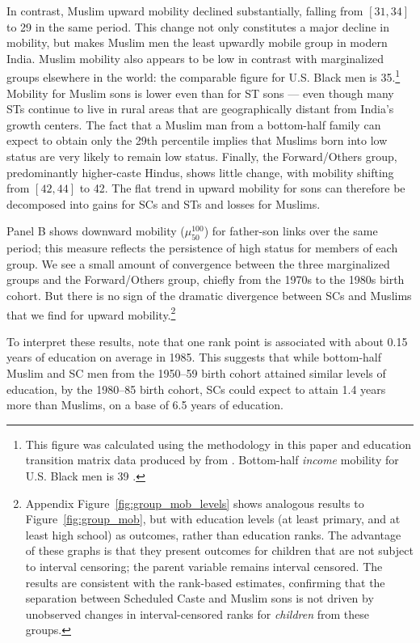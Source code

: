 \documentclass[12pt,letterpaper]{article}
\numberwithin{equation}{section}
\begin{document}
In contrast, Muslim upward mobility declined substantially, falling from $[31, 34]$ to 29 in the same period. This change not only constitutes a major decline in mobility, but makes Muslim men the least upwardly mobile group in modern India. Muslim mobility also appears to be low in contrast with marginalized groups elsewhere in the world: the comparable figure for U.S. Black men is 35.\footnote{This figure was calculated using the methodology in this paper and education transition matrix data produced by  from . Bottom-half \textit{income} mobility for U.S. Black men is 39 \cite{chetty2018}.} Mobility for Muslim sons is lower even than for ST sons --- even though many STs continue to live in rural areas that are geographically distant from India's growth centers. The fact that a Muslim man from a bottom-half family can expect to obtain only the 29th percentile implies that Muslims born into low status are very likely to remain low status. Finally, the Forward/Others group, predominantly higher-caste Hindus, shows little change, with mobility shifting from $[42,44]$ to 42. The flat trend in upward mobility for sons can therefore be decomposed into gains for SCs and STs and losses for Muslims.

Panel B shows downward mobility ($\mu_{50}^{100}$) for father-son links over the same period; this measure reflects the persistence of high status for members of each group. We see a small amount of convergence between the three marginalized groups and the Forward/Others group, chiefly from the 1970s to the 1980s birth cohort. But there is no sign of the dramatic divergence between SCs and Muslims that we find for upward mobility.\footnote{Appendix Figure~\ref{fig:group_mob_levels} shows analogous results to Figure~\ref{fig:group_mob}, but with education levels (at least primary, and at least high school) as outcomes, rather than education ranks. The advantage of these graphs is that they present outcomes for children that are not subject to interval censoring; the parent variable remains interval censored. The results are consistent with the rank-based estimates, confirming that the separation between Scheduled Caste and Muslim sons is not driven by unobserved changes in interval-censored ranks for \textit{children} from these groups.}

To interpret these results, note that one rank point is associated with about 0.15 years of education on average in 1985. This suggests that while bottom-half Muslim and SC men from the 1950--59 birth cohort attained similar levels of education, by the 1980--85 birth cohort, SCs could expect to attain 1.4 years more than Muslims, on a base of 6.5 years of education.
\end{document}
